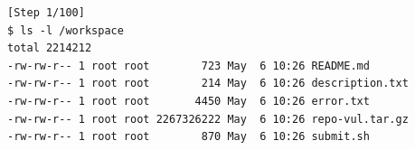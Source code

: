 
\begin{tcolorbox}[enhanced,title={Example of \texttt{grep}/\texttt{ls}/\texttt{find} attempts}]
\begin{verbatim}
[Step 1/100]
$ ls -l /workspace
total 2214212
-rw-rw-r-- 1 root root        723 May  6 10:26 README.md
-rw-rw-r-- 1 root root        214 May  6 10:26 description.txt
-rw-rw-r-- 1 root root       4450 May  6 10:26 error.txt
-rw-rw-r-- 1 root root 2267326222 May  6 10:26 repo-vul.tar.gz
-rw-rw-r-- 1 root root        870 May  6 10:26 submit.sh
\end{verbatim}








\end{tcolorbox}
